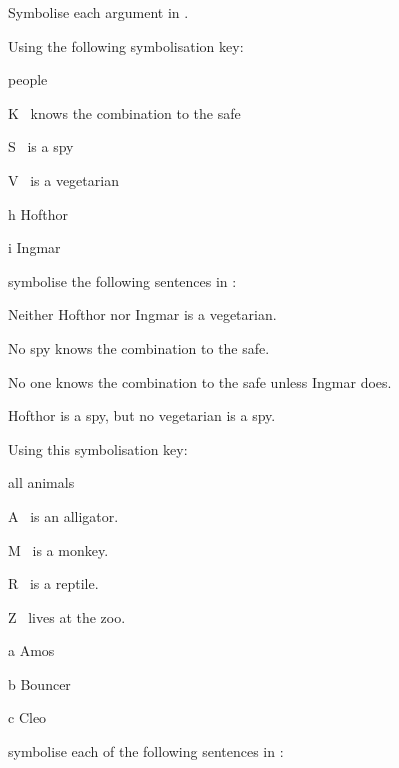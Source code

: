 Symbolise each argument in \FOL.



\problempart
\label{pr.FOLvegetarians}
Using the following symbolisation key:
\begin{ekey}
\item[\text{domain}] people
\item[K] \blank\ knows the combination to the safe
\item[S] \blank\ is a spy
\item[V] \blank\ is a vegetarian
\item[h] Hofthor
\item[i] Ingmar
\end{ekey}
symbolise the following sentences in \FOL:
\begin{earg}
\item Neither Hofthor nor Ingmar is a vegetarian.
\item No spy knows the combination to the safe.
\item No one knows the combination to the safe unless Ingmar does.
\item Hofthor is a spy, but no vegetarian is a spy.
\end{earg}
\solutions
\problempart\label{pr.FOLalligators}
Using this symbolisation key:
\begin{ekey}
\item[\text{domain}] all animals
\item[A] \blank\ is an alligator.
\item[M] \blank\ is a monkey.
\item[R] \blank\ is a reptile.
\item[Z] \blank\ lives at the zoo.
\item[a] Amos
\item[b] Bouncer
\item[c] Cleo
\end{ekey}
symbolise each of the following sentences in \FOL:
